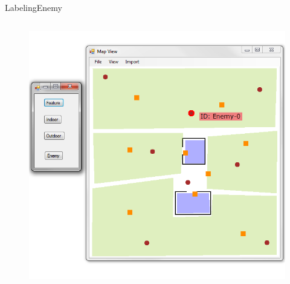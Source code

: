 \begin{frame}{Labeling}{Enemy}

\begin{columns}
\begin{figure}
\centering
\includegraphics[width = \textwidth]{./screenshot/enemy_label.png}
\end{figure}

\begin{minipage}{\textwidth}
\end{minipage}
\end{columns}

\end{frame}

